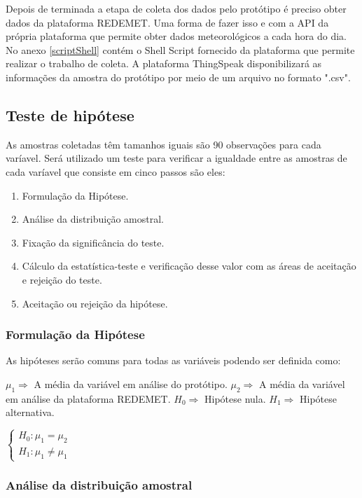 Depois de terminada a etapa de coleta dos dados pelo protótipo é preciso obter dados da plataforma REDEMET. Uma forma de fazer isso e com a API da própria plataforma que permite obter dados meteorológicos a cada hora do dia. No anexo \ref{scriptShell} contém o Shell Script fornecido da plataforma que permite realizar o trabalho de coleta. A plataforma ThingSpeak disponibilizará as informações da amostra do protótipo por meio de um arquivo no formato ".csv".

\subsection{Teste de hipótese}

As amostras coletadas têm tamanhos iguais são 90 observações para cada varíavel. Será utilizado um teste para verificar a igualdade entre as amostras de cada varíavel que consiste em cinco passos são eles:

\begin{enumerate}
   \item Formulação da Hipótese.
   \item Análise da distribuição amostral.
   \item Fixação da significância do teste.
   \item Cálculo da estatística-teste e verificação desse valor com as áreas de aceitação e rejeição do teste.
   \item Aceitação ou rejeição da hipótese.
\end{enumerate}

\subsubsection{Formulação da Hipótese}
As hipóteses serão comuns para todas as variáveis podendo ser definida como:

{\raggedright $\mu_1 \Rightarrow$ A média da variável em análise do protótipo. 
\newline $\mu_2 \Rightarrow$ A média da variável em análise da plataforma REDEMET. 
\newline $ H_0 \Rightarrow$ Hipótese nula.
\newline $ H_1 \Rightarrow$ Hipótese alternativa.

$
\begin{cases}
H_0: \mu_1 = \mu_2 \\
H_1: \mu_1 \neq \mu_1
\end{cases}
$
}

\subsubsection{Análise da distribuição amostral}

